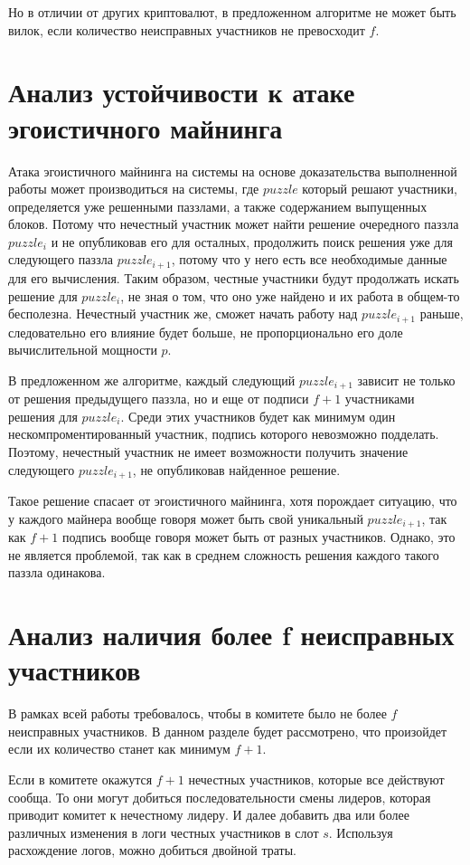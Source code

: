 Но в отличии от других криптовалют, в предложенном алгоритме не может быть вилок, если количество неисправных участников не превосходит $f$.

\section{Анализ устойчивости к атаке эгоистичного майнинга}
Атака эгоистичного майнинга на системы на основе доказательства выполненной работы может производиться на системы, где $puzzle$ который решают участники, определяется уже решенными паззлами, а также содержанием выпущенных блоков. Потому что нечестный участник может найти решение очередного паззла $puzzle_i$ и не опубликовав его для осталных, продолжить поиск решения уже для следующего паззла $puzzle_{i+1}$, потому что у него есть все необходимые данные для его вычисления. Таким образом, честные участники будут продолжать искать решение для $puzzle_i$, не зная о том, что оно уже найдено и их работа в общем-то бесполезна. Нечестный участник же, сможет начать работу над $puzzle_{i+1}$ раньше, следовательно его влияние будет больше, не пропорционально его доле вычислительной мощности $p$.

В предложенном же алгоритме, каждый следующий $puzzle_{i+1}$ зависит не только от решения предыдущего паззла, но и еще от подписи $f+1$ участниками решения для $puzzle_i$. Среди этих участников будет как минимум один нескомпроментированный участник, подпись которого невозможно подделать. Поэтому, нечестный участник не имеет возможности получить значение следующего $puzzle_{i+1}$, не опубликовав найденное решение.

Такое решение спасает от эгоистичного майнинга, хотя порождает ситуацию, что у каждого майнера вообще говоря может быть свой уникальный $puzzle_{i+1}$, так как $f+1$ подпись вообще говоря может быть от разных участников. Однако, это не является проблемой, так как в среднем сложность решения каждого такого паззла одинакова.
 
\section{Анализ наличия более f неисправных участников}
В рамках всей работы требовалось, чтобы в комитете было не более $f$ неисправных участников.
В данном разделе будет рассмотрено, что произойдет если их количество станет как минимум $f+1$.

Если в комитете окажутся $f+1$ нечестных участников, которые все действуют сообща. То они могут добиться последовательности смены лидеров, которая приводит комитет к нечестному лидеру. И далее добавить два или более различных изменения в логи честных участников в слот $s$. Используя расхождение логов, можно добиться двойной траты.

